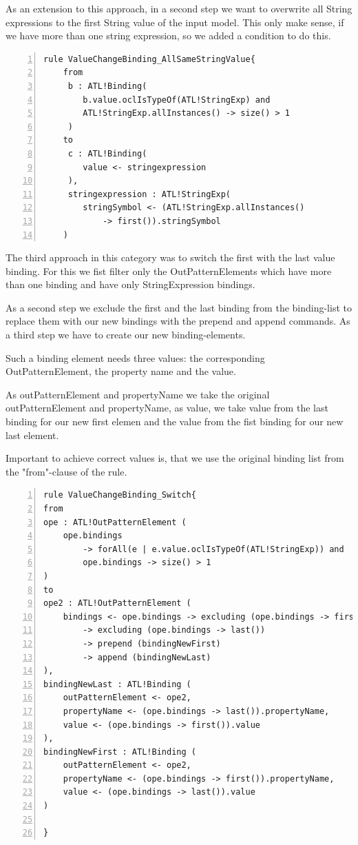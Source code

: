 \documentclass{llncs}
\begin{document}
As an extension to this approach, in a second step we want to overwrite all String expressions to the first String value of the input model. This only make sense, if we have more than one string expression, so we added a condition to do this.

\begin{lstlisting}[language=ATL, numbers=left,xleftmargin=5.0ex, caption=ValueChangeBinding-Definition using same constant string value., label=lst:vcbconstant]
rule ValueChangeBinding_AllSameStringValue{
	from
	 b : ATL!Binding(
	 	b.value.oclIsTypeOf(ATL!StringExp) and 
		ATL!StringExp.allInstances() -> size() > 1
	 )
	to
	 c : ATL!Binding(
	 	value <- stringexpression
	 ), 
	 stringexpression : ATL!StringExp(
	 	stringSymbol <- (ATL!StringExp.allInstances() 
			-> first()).stringSymbol
	)
\end{lstlisting}

The third approach in this category was to switch the first with the last value binding. For this we fist filter only the OutPatternElements which have more than one binding and have only StringExpression bindings.

As a second step we exclude the first and the last binding from the binding-list to replace them with our new bindings with the prepend and append commands. As a third step we have to create our new binding-elements.

Such a binding element needs three values: the corresponding OutPatternElement, the property name and the value.

As outPatternElement and propertyName we take the original outPatternElement and propertyName, as value, we take value from the last binding for our new first elemen and the value from the fist binding for our new last element.

Important to achieve correct values is, that we use the original binding list from the "from"-clause of the rule.

\begin{lstlisting}[language=ATL, numbers=left,xleftmargin=5.0ex, caption=ValueChangeBinding-Definition using values from input models., label=lst:2ndOrderHOT]
rule ValueChangeBinding_Switch{
from
ope : ATL!OutPatternElement (
	ope.bindings 
		-> forAll(e | e.value.oclIsTypeOf(ATL!StringExp)) and
		ope.bindings -> size() > 1
)
to
ope2 : ATL!OutPatternElement (
	bindings <- ope.bindings -> excluding (ope.bindings -> first()) 
		-> excluding (ope.bindings -> last())
		-> prepend (bindingNewFirst)
		-> append (bindingNewLast)
), 
bindingNewLast : ATL!Binding (
	outPatternElement <- ope2, 
	propertyName <- (ope.bindings -> last()).propertyName,
	value <- (ope.bindings -> first()).value
),
bindingNewFirst : ATL!Binding (
	outPatternElement <- ope2,
	propertyName <- (ope.bindings -> first()).propertyName,
	value <- (ope.bindings -> last()).value	
)
	
}
\end{lstlisting}
\end{document}
